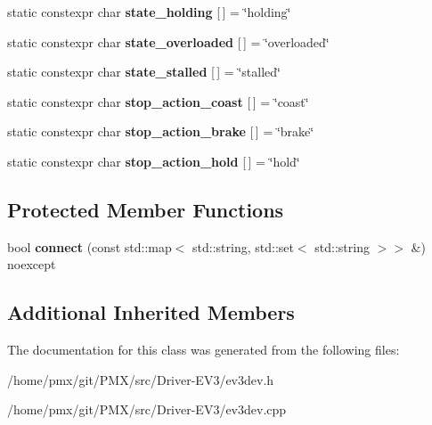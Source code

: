 \begin{DoxyCompactItemize}
static constexpr char {\bfseries state\+\_\+holding} \mbox{[}$\,$\mbox{]} = \char`\"{}holding\char`\"{}
\item 
\mbox{\label{classev3dev_1_1motor_a325f15a3a691c2cf4f7d5e777b4b4739}} 
static constexpr char {\bfseries state\+\_\+overloaded} \mbox{[}$\,$\mbox{]} = \char`\"{}overloaded\char`\"{}
\item 
\mbox{\label{classev3dev_1_1motor_a210fc6798d7007fe291124813d4c261f}} 
static constexpr char {\bfseries state\+\_\+stalled} \mbox{[}$\,$\mbox{]} = \char`\"{}stalled\char`\"{}
\item 
\mbox{\label{classev3dev_1_1motor_a9530f7f6a8a4cfb4371f235402b432f4}} 
static constexpr char {\bfseries stop\+\_\+action\+\_\+coast} \mbox{[}$\,$\mbox{]} = \char`\"{}coast\char`\"{}
\item 
\mbox{\label{classev3dev_1_1motor_a314ec3b9bbd438e5493ecb2e7bd6b57f}} 
static constexpr char {\bfseries stop\+\_\+action\+\_\+brake} \mbox{[}$\,$\mbox{]} = \char`\"{}brake\char`\"{}
\item 
\mbox{\label{classev3dev_1_1motor_ab73b82037e6377ac43c9ca963096bbbd}} 
static constexpr char {\bfseries stop\+\_\+action\+\_\+hold} \mbox{[}$\,$\mbox{]} = \char`\"{}hold\char`\"{}
\end{DoxyCompactItemize}
\subsection*{Protected Member Functions}
\begin{DoxyCompactItemize}
\item 
\mbox{\label{classev3dev_1_1motor_ac1a782535037c9e34917cbb0b3f393a3}} 
bool {\bfseries connect} (const std\+::map$<$ std\+::string, std\+::set$<$ std\+::string $>$$>$ \&) noexcept
\end{DoxyCompactItemize}
\subsection*{Additional Inherited Members}


The documentation for this class was generated from the following files\+:\begin{DoxyCompactItemize}
\item 
/home/pmx/git/\+P\+M\+X/src/\+Driver-\/\+E\+V3/ev3dev.\+h\item 
/home/pmx/git/\+P\+M\+X/src/\+Driver-\/\+E\+V3/ev3dev.\+cpp\end{DoxyCompactItemize}
